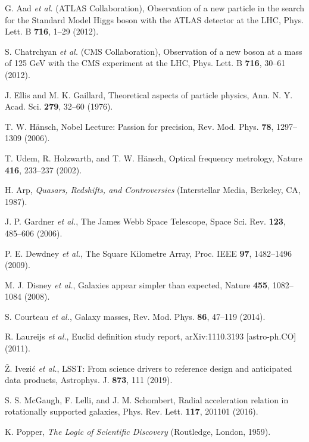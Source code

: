 \documentclass[twocolumn,aps,prl]{revtex4-2}
\begin{document}
\begin{thebibliography}{99}
		 G. Aad \textit{et al.} (ATLAS Collaboration), Observation of a new particle in the search for the Standard Model Higgs boson with the ATLAS detector at the LHC, Phys. Lett. B \textbf{716}, 1--29 (2012).
		
		 S. Chatrchyan \textit{et al.} (CMS Collaboration), Observation of a new boson at a mass of 125 GeV with the CMS experiment at the LHC, Phys. Lett. B \textbf{716}, 30--61 (2012).
		
		 J. Ellis and M. K. Gaillard, Theoretical aspects of particle physics, Ann. N. Y. Acad. Sci. \textbf{279}, 32--60 (1976).
		
		 T. W. Hänsch, Nobel Lecture: Passion for precision, Rev. Mod. Phys. \textbf{78}, 1297--1309 (2006).
		
		 T. Udem, R. Holzwarth, and T. W. Hänsch, Optical frequency metrology, Nature \textbf{416}, 233--237 (2002).
		
		 H. Arp, \textit{Quasars, Redshifts, and Controversies} (Interstellar Media, Berkeley, CA, 1987).
		
		 J. P. Gardner \textit{et al.}, The James Webb Space Telescope, Space Sci. Rev. \textbf{123}, 485--606 (2006).
		
		 P. E. Dewdney \textit{et al.}, The Square Kilometre Array, Proc. IEEE \textbf{97}, 1482--1496 (2009).
		
		 M. J. Disney \textit{et al.}, Galaxies appear simpler than expected, Nature \textbf{455}, 1082--1084 (2008).
		
		 S. Courteau \textit{et al.}, Galaxy masses, Rev. Mod. Phys. \textbf{86}, 47--119 (2014).
		
		 R. Laureijs \textit{et al.}, Euclid definition study report, arXiv:1110.3193 [astro-ph.CO] (2011).
		
		 Ž. Ivezić \textit{et al.}, LSST: From science drivers to reference design and anticipated data products, Astrophys. J. \textbf{873}, 111 (2019).
		
		 S. S. McGaugh, F. Lelli, and J. M. Schombert, Radial acceleration relation in rotationally supported galaxies, Phys. Rev. Lett. \textbf{117}, 201101 (2016).
		
		 K. Popper, \textit{The Logic of Scientific Discovery} (Routledge, London, 1959).
		

\end{thebibliography}
\end{document}
